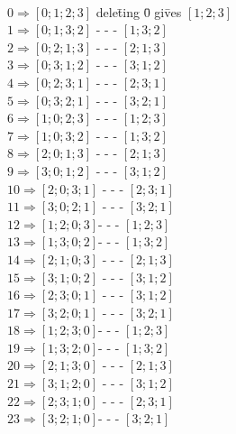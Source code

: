 \documentclass{article} %
\begin{document}
\begin{tabbing}
\\
\(     0   \Rightarrow  [0; 1; 2; 3] \)  dele\=ting \=0  gi\=ves  \=\(  [1; 2; 3] \)
\\
\(     1 \Rightarrow  [0; 1; 3; 2] \)   \>-   \> -   \> -  \> \(  [1; 3; 2] \)
\\
\(     2  \Rightarrow  [0; 2; 1; 3]\)   \>-  \>- \>-    \>  \(  [2; 1; 3] \)
\\
\(     3   \Rightarrow  [0; 3; 1; 2] \)  \>-  \>- \>-    \>  \(  [3; 1; 2] \)
\\
\(     4   \Rightarrow  [0; 2; 3; 1] \)  \>-  \>- \>-    \>  \(  [2; 3; 1] \)
\\
\(     5   \Rightarrow  [0; 3; 2; 1] \)  \>-  \>- \>-    \>  \(  [3; 2; 1] \)
\\
\(     6   \Rightarrow  [1; 0; 2; 3] \) \>-  \>- \>-    \>  \(  [1; 2; 3] \)
\\
\(     7   \Rightarrow  [1; 0; 3; 2] \)  \>-   \> -  \> -      \> \(  [1; 3; 2] \)
\\
\(     8   \Rightarrow  [2; 0; 1; 3]\)  \>-  \>- \>-    \>  \(  [2; 1; 3] \)
\\
\(     9   \Rightarrow  [3; 0; 1; 2] \)  \>-  \>- \>-    \>  \(  [3; 1; 2] \)
\\
\(     10   \Rightarrow  [2; 0; 3; 1] \)  \>-  \>- \>-    \>  \(  [2; 3; 1] \)
\\
\(     11   \Rightarrow  [3; 0; 2; 1] \) \>-  \>- \>-    \>  \(  [3; 2; 1] \)
\\
\(     12   \Rightarrow  [1; 2; 0; 3] \)\>-  \>- \>-    \>  \(  [1; 2; 3] \)
\\
\(     13   \Rightarrow  [1; 3; 0; 2] \)\>-       \> -      \> -      \> \(  [1; 3; 2] \)
\\
\(     14   \Rightarrow  [2; 1; 0; 3] \)  \>-  \>- \>-    \>  \(  [2; 1; 3] \)
\\
\(     15   \Rightarrow  [3; 1; 0; 2] \)  \>-  \>- \>-    \>  \(  [3; 1; 2] \)
\\
\(     16   \Rightarrow  [2; 3; 0; 1] \) \>-  \>- \>-    \>  \(  [3; 1; 2] \)
\\
\(     17   \Rightarrow  [3; 2; 0; 1] \) \>-  \>- \>-    \>  \(  [3; 2; 1] \)
\\
\(     18   \Rightarrow  [1; 2; 3; 0] \)\>-  \>- \>-    \>  \(  [1; 2; 3] \)
\\
\(     19   \Rightarrow  [1; 3; 2; 0] \)\>-   \> -  \> -  \> \(  [1; 3; 2] \)
\\
\(     20   \Rightarrow  [2; 1; 3; 0] \)  \>-  \>- \>-    \>  \(  [2; 1; 3] \)
\\
\(     21   \Rightarrow  [3; 1; 2; 0] \)  \>-  \>- \>-    \>  \(  [3; 1; 2] \)
\\
\(     22   \Rightarrow  [2; 3; 1; 0] \) \>-  \>- \>-    \>  \(  [2; 3; 1] \)
\\
\(     23   \Rightarrow  [3; 2; 1; 0] \)\>-  \>- \>-    \>  \(  [3; 2; 1] \)
\\
\end{tabbing}
\end{document}

